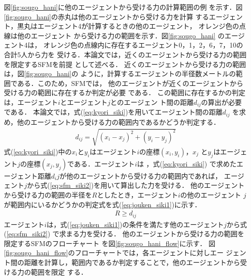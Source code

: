 %
図\ref{fig:sougo_hani}に他のエージェントから受ける力の計算範囲の例
を示す．図\ref{fig:sougo_hani}の赤丸は他のエージェントから受ける力を計算
するエージェント，黒丸はエージェント4が計算するときの他のエージェント，
オレンジ色の点線は他のエージェント
から受ける力の範囲を示す．図\ref{fig:sougo_hani} のエージェント4は，
オレンジ色の点線内に存在するエージェント0，1，2，6，7，10の合計5人から力を
受ける．本論文では，近くのエージェントから受ける力の範囲を限定するSFMを前提
として述べる．
近くのエージェントから受ける力の範囲は，図\ref{fig:sougo_hani}の
ように，計算するエージェントの半径数メートルの範囲である．このため，SFMでは，
他のエージェントが近くのエージェントから受ける力の範囲に存在するか判定が必要
である．
この範囲に存在するかの判定は，エージェント$i$とエージェント$j$とのエージェン
ト間の距離$d_{ij}$の算出が必要である．
本論文では，式(\ref{eq:kyori_siki})を用いてエージェント間の距離$d_{ij}$
を求め，他のエージェントから受ける力の範囲内であるかどうか判定する．
%
\begin{eqnarray}
　d_{ij} =  \sqrt{ (x_i-x_j)^2 + (y_i-y_j)^2 }
 \label{eq:kyori_siki}
\end{eqnarray}
%
式(\ref{eq:kyori_siki})中の$x_i$と$y_i$はエージェント$i$の座標$(x_i,y_i)$，$x_j$
と$y_j$はエージェント$j$の座標$(x_j,y_j)$である．エージェント$i$は
，式(\ref{eq:kyori_siki})
で求めたエージェント距離$d_ij$が他のエージェントから受ける力の範囲内であれば，
エージェント$j$から式(\ref{eq:sfm_siki2})を用いて算出した力を受ける．
他のエージェントから受ける力の範囲の半径を$R$としたとき，エージェント$i$の他のエージェント
$j$が範囲内にいるかどうかの判定式を式(\ref{eq:jouken_siki1})に示す．
%
\begin{eqnarray}
  \label{eq:jouken_siki1}
  R \geq d_{ij}
\end{eqnarray}
%
エージェント$i$は，式(\ref{eq:jouken_siki1})の条件を満たす他のエージェント$j$から式(\ref{eq:sfm_siki2})
で求まる力を受ける．
他のエージェントから受ける力の範囲を限定するSFMのフローチャート
を図\ref{fig:sougo_hani_flow}に示す．
図\ref{fig:sougo_hani_flow}のフローチャートでは，各エージェントに対しエー
ジェント間の距離を計算し，範囲内であるか判定することで，他のエージェントから受ける力の範囲を限定
する．



\clearpage
